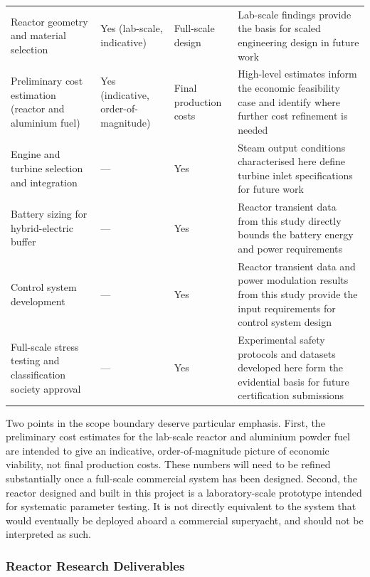 \documentclass[12pt]{article}
\begin{document}
\begin{longtable}{p{3.2cm} p{1.8cm} p{1.8cm} p{7.2cm}}
Reactor geometry and material selection & 
Yes (lab-scale, indicative) & Full-scale design & 
Lab-scale findings provide the basis for scaled engineering design in 
future work \\[6pt]

Preliminary cost estimation (reactor and aluminium fuel) & 
Yes (indicative, order-of-magnitude) & Final production costs & 
High-level estimates inform the economic feasibility case and identify 
where further cost refinement is needed \\[6pt]

Engine and turbine selection and integration & 
--- & Yes & 
Steam output conditions characterised here define turbine inlet 
specifications for future work \\[6pt]

Battery sizing for hybrid-electric buffer & 
--- & Yes & 
Reactor transient data from this study directly bounds the battery energy 
and power requirements \\[6pt]

Control system development & 
--- & Yes & 
Reactor transient data and power modulation results from this study 
provide the input requirements for control system design \\[6pt]

Full-scale stress testing and classification society approval & 
--- & Yes & 
Experimental safety protocols and datasets developed here form the 
evidential basis for future certification submissions \\

\end{longtable}
\addtocounter{table}{-1}
\label{tab:scope}

Two points in the scope boundary deserve particular emphasis. First, the preliminary 
cost estimates for the lab-scale reactor and aluminium powder fuel are intended to 
give an indicative, order-of-magnitude picture of economic viability, not final 
production costs. These numbers will need to be refined substantially once a 
full-scale commercial system has been designed. Second, the reactor designed and 
built in this project is a laboratory-scale prototype intended for systematic 
parameter testing. It is not directly equivalent to the system that would eventually 
be deployed aboard a commercial superyacht, and should not be interpreted as such.

\subsubsection*{Reactor Research Deliverables}
\end{document}
